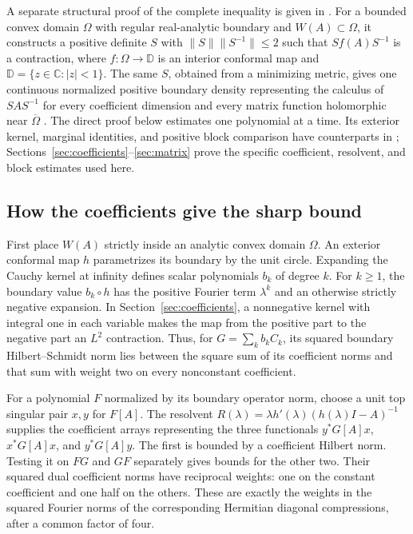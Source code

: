 \documentclass[11pt]{article}
\newcommand{\C}{\mathbb C}
\newcommand{\D}{\mathbb D}
\theoremstyle{remark}\newtheorem{remark}[theorem]{Remark}
\numberwithin{equation}{section}
\begin{document}
A separate structural proof of the complete inequality is given in
\cite{OpenAI2026Complete}. For a bounded convex domain $\Omega$ with
regular real-analytic boundary and $W(A)\subset\Omega$, it constructs a
positive definite $S$ with $\|S\|\|S^{-1}\|\le2$ such that
$S f(A)S^{-1}$ is a contraction, where $f:\Omega\to\D$ is an interior
conformal map and $\D=\{z\in\C:|z|<1\}$. The same $S$, obtained from a
minimizing metric, gives one continuous normalized positive boundary density representing
the calculus of $SAS^{-1}$ for every coefficient dimension and every
matrix function holomorphic near $\overline\Omega$
\cite[Theorems~1.2--1.3 and Proposition~2.1]{OpenAI2026Complete}.
The direct proof below estimates one polynomial at a time. Its exterior
kernel, marginal identities, and positive block comparison have counterparts
in \cite[Propositions~3.1 and~3.3 and Lemma~5.1]{OpenAI2026Complete};
Sections~\ref{sec:coefficients}--\ref{sec:matrix} prove the specific
coefficient, resolvent, and block estimates used here.

\subsection*{How the coefficients give the sharp bound}
First place $W(A)$ strictly inside an analytic convex domain $\Omega$.
An exterior conformal map $h$ parametrizes its boundary by the unit circle.
Expanding the Cauchy kernel at infinity defines scalar polynomials $b_k$ of degree
$k$. For $k\ge1$, the boundary value $b_k\circ h$ has the positive Fourier
term $\lambda^k$ and an otherwise strictly negative expansion. In
Section~\ref{sec:coefficients}, a nonnegative kernel with integral one in
each variable makes the map from the positive part to the negative part an
$L^2$ contraction. Thus, for $G=\sum_k b_kC_k$, its squared boundary
Hilbert--Schmidt norm lies between the square sum of its coefficient norms
and that sum with weight two on every nonconstant coefficient.

For a polynomial $F$ normalized by its boundary operator norm, choose a
unit top singular pair $x,y$ for $F[A]$. The resolvent
$R(\lambda)=\lambda h'(\lambda)(h(\lambda)I-A)^{-1}$ supplies the
coefficient arrays representing the three functionals
$y^*G[A]x$, $x^*G[A]x$, and $y^*G[A]y$. The first is bounded by a
coefficient Hilbert norm. Testing it on $FG$ and $GF$ separately gives
bounds for the other two. Their squared dual coefficient norms have reciprocal
weights: one on the constant coefficient and one half on the others.
These are exactly the weights in the squared Fourier norms of the corresponding
Hermitian diagonal compressions, after a common factor of four.
\end{document}

